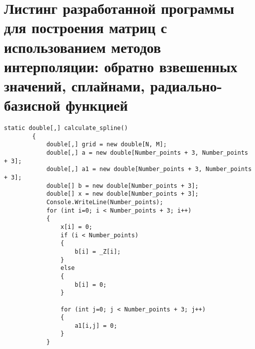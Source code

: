 \chapter{Листинг разработанной программы для построения матриц с использованием методов интерполяции: обратно взвешенных значений, сплайнами, радиально-базисной функцией}


\begin{lstlisting}[caption={Метод интерполяции сплайном}, label={ls:a:01}]
static double[,] calculate_spline()
        {
            double[,] grid = new double[N, M];
            double[,] a = new double[Number_points + 3, Number_points + 3];
            double[,] a1 = new double[Number_points + 3, Number_points + 3];
            double[] b = new double[Number_points + 3];
            double[] x = new double[Number_points + 3];
            Console.WriteLine(Number_points);
            for (int i=0; i < Number_points + 3; i++)
            {
                x[i] = 0;
                if (i < Number_points)
                {
                    b[i] = _Z[i];
                }
                else
                {
                    b[i] = 0;
                }

                for (int j=0; j < Number_points + 3; j++)
                {
                    a1[i,j] = 0;
                }
            }


\end{lstlisting}
